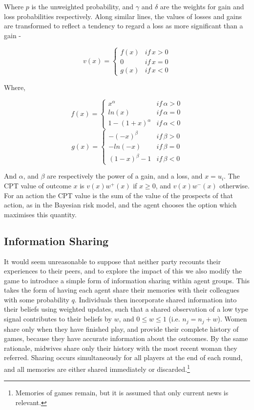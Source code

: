 Where $p$ is the unweighted probability, and $\gamma$ and $\delta$
are the weights for gain and loss probabilities respectively. Along similar lines, the values of losses and gains are transformed to reflect a tendency to regard a loss as more significant than a gain  -

\[
v(x)=\begin{cases}
f(x) & if\, x>0\\
0 & if\, x=0\\
g(x) & if\, x<0
\end{cases}
\]


Where,

\[
f(x)=\begin{cases}
x^{\alpha} & if\,\alpha>0\\
ln(x) & if\,\alpha=0\\
1-(1+x)^{\alpha} & if\,\alpha<0
\end{cases}
\]
\[
g(x)=\begin{cases}
-(-x)^{\beta} & if\,\beta>0\\
-ln(-x) & if\,\beta=0\\
(1-x)^{\beta}-1 & if\,\beta<0
\end{cases}
\]


And $\alpha$, and $\beta$ are respectively the power of a gain,
and a loss, and \(x=u_{i}\). The \ac{CPT} value of outcome $x$ is $v(x)w^{+}(x)$
if $x\geq0$, and $v(x)w^{-}(x)$ otherwise. For an action the \ac{CPT}
value is the sum of the value of the prospects of that action, as
in the Bayesian risk model, and the agent chooses the option which maximises this quantity.

\subsection{Information Sharing}
\label{sub:info_sharing}

It would seem unreasonable to suppose that neither party recounts their experiences to their peers, and to explore the impact of this we also modify the game to introduce a simple form of information sharing within agent groups. This takes the form of having each agent share their memories with their colleagues with some probability \(q\). Individuals then incorporate shared information into their beliefs using weighted updates, such that a shared observation of a low type signal contributes to their beliefs by \(w\), and \(0\leq w\leq 1\) (i.e. \(n_{j} = n_{j} + w\)).
Women share only when they have finished play, and provide their complete history of games, because they have accurate information about the outcomes. By the same rationale, midwives share only their history with the most recent woman they referred. Sharing occurs simultaneously for all players at the end of each round, and all memories are either shared immediately or discarded.\footnote{Memories of games remain, but it is assumed that only current news is relevant.}

